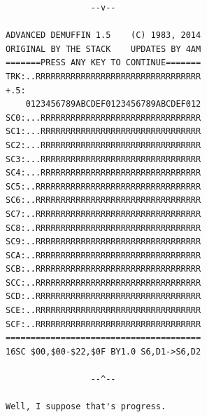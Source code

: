 \documentclass{article}
\begin{document}
\begin{verbatim}
                 --v--

ADVANCED DEMUFFIN 1.5    (C) 1983, 2014
ORIGINAL BY THE STACK    UPDATES BY 4AM
=======PRESS ANY KEY TO CONTINUE=======
TRK:..RRRRRRRRRRRRRRRRRRRRRRRRRRRRRRRRR
+.5:
    0123456789ABCDEF0123456789ABCDEF012
SC0:...RRRRRRRRRRRRRRRRRRRRRRRRRRRRRRRR
SC1:...RRRRRRRRRRRRRRRRRRRRRRRRRRRRRRRR
SC2:...RRRRRRRRRRRRRRRRRRRRRRRRRRRRRRRR
SC3:...RRRRRRRRRRRRRRRRRRRRRRRRRRRRRRRR
SC4:...RRRRRRRRRRRRRRRRRRRRRRRRRRRRRRRR
SC5:..RRRRRRRRRRRRRRRRRRRRRRRRRRRRRRRRR
SC6:..RRRRRRRRRRRRRRRRRRRRRRRRRRRRRRRRR
SC7:..RRRRRRRRRRRRRRRRRRRRRRRRRRRRRRRRR
SC8:..RRRRRRRRRRRRRRRRRRRRRRRRRRRRRRRRR
SC9:..RRRRRRRRRRRRRRRRRRRRRRRRRRRRRRRRR
SCA:..RRRRRRRRRRRRRRRRRRRRRRRRRRRRRRRRR
SCB:..RRRRRRRRRRRRRRRRRRRRRRRRRRRRRRRRR
SCC:..RRRRRRRRRRRRRRRRRRRRRRRRRRRRRRRRR
SCD:..RRRRRRRRRRRRRRRRRRRRRRRRRRRRRRRRR
SCE:..RRRRRRRRRRRRRRRRRRRRRRRRRRRRRRRRR
SCF:..RRRRRRRRRRRRRRRRRRRRRRRRRRRRRRRRR
=======================================
16SC $00,$00-$22,$0F BY1.0 S6,D1->S6,D2

                 --^--

Well, I suppose that's progress.
\end{verbatim}

\vspace*{\fill}

\end{document}
